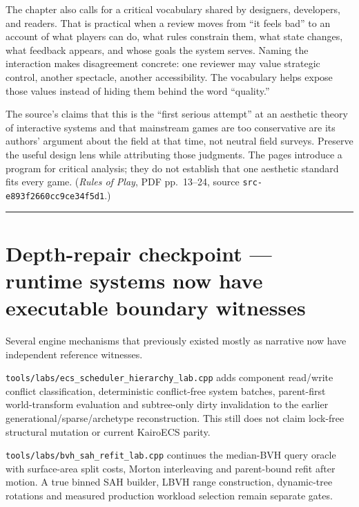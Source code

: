 The chapter also calls for a critical vocabulary shared by designers, developers, and readers. That is practical when a review moves from ``it feels bad'' to an account of what players can do, what rules constrain them, what state changes, what feedback appears, and whose goals the system serves. Naming the interaction makes disagreement concrete: one reviewer may value strategic control, another spectacle, another accessibility. The vocabulary helps expose those values instead of hiding them behind the word ``quality.''

The source's claims that this is the ``first serious attempt'' at an aesthetic theory of interactive systems and that mainstream games are too conservative are its authors' argument about the field at that time, not neutral field surveys. Preserve the useful design lens while attributing those judgments. The pages introduce a program for critical analysis; they do not establish that one aesthetic standard fits every game. (\emph{Rules of Play}, PDF pp.~13--24, source \texttt{src-e893f2660cc9ce34f5d1}.)

\begin{center}\rule{0.5\linewidth}{0.5pt}\end{center}

\section{Depth-repair checkpoint --- runtime systems now have executable boundary witnesses}\label{06-engine-ii-ch047-depth-repair-checkpoint-runtime-systems-now-have-executable-boundary-witnesses}

Several engine mechanisms that previously existed mostly as narrative now have independent reference witnesses.

\texttt{tools/labs/ecs\_scheduler\_hierarchy\_lab.cpp} adds component read/write conflict classification, deterministic conflict-free system batches, parent-first world-transform evaluation and subtree-only dirty invalidation to the earlier generational/sparse/archetype reconstruction. This still does not claim lock-free structural mutation or current KairoECS parity.

\texttt{tools/labs/bvh\_sah\_refit\_lab.cpp} continues the median-BVH query oracle with surface-area split costs, Morton interleaving and parent-bound refit after motion. A true binned SAH builder, LBVH range construction, dynamic-tree rotations and measured production workload selection remain separate gates.

